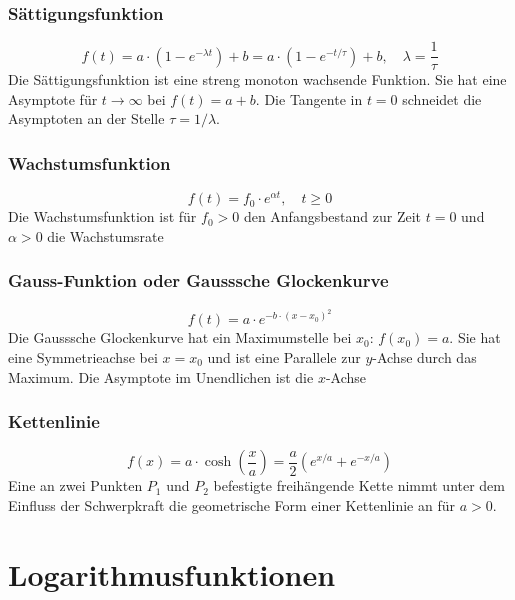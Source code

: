 \subsubsection{Sättigungsfunktion}
\begin{equation}
\boxed{f\left(t\right)=a\cdot \left(1-e^{-\lambda t}\right)+b=a\cdot \left(1-e^{-t/\tau}\right)+b,\quad \lambda=\dfrac{1}{\tau}}
\end{equation}
Die Sättigungsfunktion ist eine streng monoton wachsende Funktion. Sie hat eine Asymptote für $t\rightarrow \infty$ bei $f\left(t\right)=a+b$. Die Tangente in $t=0$ schneidet die Asymptoten an der Stelle $\tau=1/\lambda.$
\subsubsection{Wachstumsfunktion}
\begin{equation}
\boxed{f\left(t\right)=f_0\cdot e^{\alpha t},\quad t\geq 0}
\end{equation}
Die Wachstumsfunktion ist für $f_0>0$ den Anfangsbestand zur Zeit $t=0$ und $\alpha>0$ die Wachstumsrate
\subsubsection{Gauss-Funktion oder Gausssche Glockenkurve}
\begin{equation}
\boxed{f\left(t\right)=a\cdot e^{-b\cdot \left(x-x_0\right)^2}}
\end{equation}
Die Gausssche Glockenkurve hat ein Maximumstelle bei $x_0$: $f\left(x_0\right)=a$. Sie hat eine Symmetrieachse bei $x=x_0$ und ist eine Parallele zur $y$-Achse durch das Maximum. Die Asymptote im Unendlichen ist die $x$-Achse
\subsubsection{Kettenlinie}
\begin{equation}
\boxed{f\left(x\right)=a\cdot \cosh\left(\dfrac{x}{a}\right)=\dfrac{a}{2}\left(e^{x/a}+e^{-x/a}\right)}
\end{equation}
Eine an zwei Punkten $P_1$ und $P_2$ befestigte freihängende Kette nimmt unter dem Einfluss der Schwerpkraft die geometrische Form einer Kettenlinie an für $a>0$.
\section{Logarithmusfunktionen}
